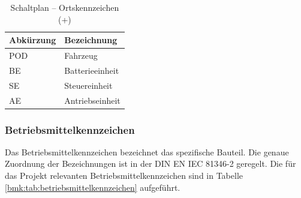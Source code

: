 \pagebreak[1]
\begin{table}[!ht]
	\centering
	\caption{Schaltplan – Ortskennzeichen (+)}
	\label{bmk:tab:ortskennzeichen}
	\begin{tabular}{ll}
		\hline
		\textbf{Abkürzung}       & \textbf{Bezeichnung} \\ \hline
		\multicolumn{1}{l|}{POD} & Fahrzeug             \\
		\multicolumn{1}{l|}{BE}  & Batterieeinheit      \\
		\multicolumn{1}{l|}{SE}  & Steuereinheit        \\
		\multicolumn{1}{l|}{AE}  & Antriebseinheit      \\ \hline
	\end{tabular}
\end{table}
\pagebreak[1]

\subsubsection{Betriebsmittelkennzeichen}
Das Betriebsmittelkennzeichen bezeichnet das spezifische Bauteil. Die genaue Zuordnung der Bezeichnungen ist in der DIN EN IEC 81346-2 geregelt. Die für das Projekt relevanten Betriebsmittelkennzeichen sind in Tabelle \ref{bmk:tab:betriebsmittelkennzeichen} aufgeführt.



